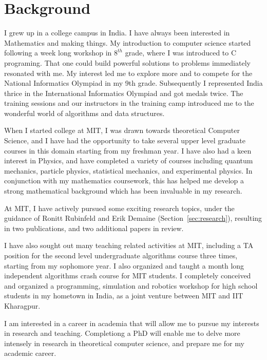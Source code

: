 \section{Background}
I grew up in a college campus in India. I have always been interested in Mathematics and making things. 
My introduction to computer science started following a week long workshop in $8^{th}$ grade, where I was introduced to C programing.
That one could build powerful solutions to problems immediately resonated with me.
My interest led me to explore more and to compete for the National Informatics Olympiad in my 9th grade.
Subsequently I represented India thrice in the International Informatics Olympiad and got medals twice.
The training sessions and our instructors in the training camp introduced me
to the wonderful world of algorithms and data structures.

When I started college at MIT, I was drawn towards theoretical Computer Science,
and I have had the opportunity to take several upper level graduate courses in this domain starting from my freshman year.
I have also had a keen interest in Physics, and have completed a variety of courses including
quantum mechanics, particle physics, statistical mechanics, and experimental physics.
In conjunction with my mathematics coursework, this has helped me develop a strong mathematical background
which has been invaluable in my research.

At MIT, I have actively pursued some exciting research topics,
under the guidance of Ronitt Rubinfeld and Erik Demaine (Section~\ref{sec:research}),
resulting in two publications, and two additional papers in review.

I have also sought out many teaching related activities at MIT, including a TA position
for the second level undergraduate algorithms course three times, starting from my sophomore year.
I also organized and taught a month long independent algorithms crash course for MIT students.
I completely conceived and organized a programming, simulation and robotics workshop for high school students
in my hometown in India, as a joint venture between MIT and IIT Kharagpur.

I am interested in a career in academia that will allow me to pursue my interests in research and teaching.
Completiong a PhD will enable me to delve more intensely in research in theoretical computer science,
and prepare me for my academic career.
